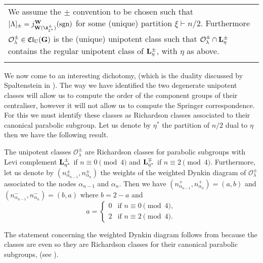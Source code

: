 \documentclass[eqthmnum]{jt-calcs}
\newcommand{\Clu}{\ensuremath{\mathfrak{Cl}_{\mathrm{U}}}}
\newenvironment{assumption}{
\begin{center}
\renewcommand{\arraystretch}{1.25}
\begin{tabular}{!{\vrule width 0.75pt}p{15cm}!{\vrule width 0.75pt}}
\noalign{\hrule height 0.75pt}
\cellcolor[gray]{0.85}
\ignorespaces
}
{
\\[.5ex]
\noalign{\hrule height 0.75pt}
\end{tabular}
\end{center}
\ignorespacesafterend
}
\begin{document}
\begin{assumption}
We assume the $\pm$ convention to be chosen such that $[\Lambda]_{\pm} = j_{\bW(\A_{\xi^*}^{\pm})}^{\bW}(\sgn)$ for some (unique) partition $\xi \vdash n/2$. Furthermore $\mathcal{O}_{\lambda}^{\pm} \in \Clu(\bG)$ is the (unique) unipotent class such that $\mathcal{O}_{\lambda}^{\pm} \cap \mathbf{L}_{\eta}^{\pm}$ contains the regular unipotent class of $\mathbf{L}_{\eta}^{\pm}$, with $\eta$ as above.
\end{assumption}

\begin{pa}
We now come to an interesting dichotomy, (which is the duality discussed by Spaltenstein in \cite[Chapitre III]{spaltenstein:1982:classes-unipotentes}). The way we have identified the two degenerate unipotent classes will allow us to compute the order of the component groups of their centraliser, however it will not allow us to compute the Springer correspondence. For this we must identify these classes as Richardson classes associated to their canonical parabolic subgroup. Let us denote by $\eta^*$ the partition of $n/2$ dual to $\eta$ then we have the following result.
\end{pa}

\begin{prop}\label{cor:richardson-degen-classes}
The unipotent classes $\mathcal{O}_{\lambda}^{\pm}$ are Richardson classes for parabolic subgroups with Levi complement $\mathbf{L}_{\eta^*}^{\pm}$ if $n \equiv 0 \pmod{4}$ and $\mathbf{L}_{\eta^*}^{\mp}$ if $n \equiv 2\pmod{4}$. Furthermore, let us denote by $(n_{\alpha_{n-1}}^{\pm},n_{\alpha_n}^{\pm})$ the weights of the weighted Dynkin diagram of $\mathcal{O}_{\lambda}^{\pm}$ associated to the nodes $\alpha_{n-1}$ and $\alpha_n$. Then we have $(n_{\alpha_{n-1}}^+,n_{\alpha_n}^+) = (a,b)$ and $(n_{\alpha_{n-1}}^-,n_{\alpha_n}^-) = (b,a)$ where $b = 2 - a$ and
\begin{equation*}
a = \begin{cases}
0 &\text{if }n\equiv 0 \pmod{4},\\
2 &\text{if }n\equiv 2 \pmod{4}.
\end{cases}
\end{equation*}
\end{prop}

\begin{rem}
The statement concerning the weighted Dynkin diagram follows from \cite[Proposition II.7.6]{spaltenstein:1982:classes-unipotentes} because the classes are even so they are Richardson classes for their canonical parabolic subgroups, (see \cite[\S7.9 - Proposition]{humphreys:1995:conjugacy-classes}).
\end{rem}
\end{document}
